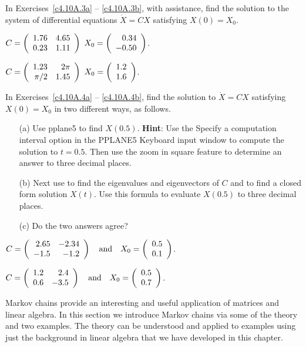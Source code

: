 \CEXER

\noindent In Exercises~\ref{c4.10A.3a} -- \ref{c4.10A.3b}, with \Matlab
assistance, find the solution to the system of differential equations
$\dot{X} = CX$ satisfying $X(0)=X_0$.
\begin{exercise}  \label{c4.10A.3a}
$C = \left(\begin{array}{rr} 1.76 & 4.65\\ 0.23 &1.11\end{array}\right)$ \AND $X_0 = \left(\begin{array}{r} 0.34 \\ -0.50\end{array}\right)$.
\end{exercise}
\begin{exercise}  \label{c4.10A.3b}
$C = \left(\begin{array}{rr} 1.23 & 2\pi\\ \pi/2 &1.45\end{array}\right)$ \AND $X_0 = \left(\begin{array}{r} 1.2 \\ 1.6\end{array}\right)$.
\end{exercise}

\noindent In Exercises~\ref{c4.10A.4a} -- \ref{c4.10A.4b}, find the solution 
to $\dot{X} = CX$ satisfying $X(0)=X_0$ in two different ways, as follows.  
\begin{itemize}
\item[(a)]  Use {\sf pplane5} to find $X(0.5)$.  {\bf Hint}: Use the 
{\sf Specify a computation interval} option in the {\sf PPLANE5 Keyboard input} 
window to compute the solution to $t=0.5$. Then use the {\sf zoom in square} 
feature to determine an answer to three decimal places.  
\item[(b)]  Next use \Matlab to find the eigenvalues and eigenvectors of $C$ 
and to find a closed form solution $X(t)$.  Use this formula to evaluate 
$X(0.5)$ to three decimal places.    
\item[(c)]  Do the two answers agree?
\end{itemize}
\begin{exercise}  \label{c4.10A.4a}  
$C = \left(\begin{array}{rr} 2.65 & -2.34\\ -1.5 &-1.2\end{array}\right) \quad\mbox{and}\quad X_0=\left(\begin{array}{r} 0.5 \\ 0.1\end{array}\right)$.
\end{exercise}
\begin{exercise}  \label{c4.10A.4b}  
$C = \left(\begin{array}{rr} 1.2 & 2.4\\ 0.6 &-3.5\end{array}\right) \quad\mbox{and}\quad X_0=\left(\begin{array}{r} 0.5 \\ 0.7\end{array}\right)$.
\end{exercise}

\label{S:TransitionApplied}

Markov chains provide an interesting and useful application of matrices and
linear algebra.  In this section we introduce Markov chains via some of the
theory and two examples.  The theory can be understood and applied to examples
using just the background in linear algebra that we have developed in this
chapter.



